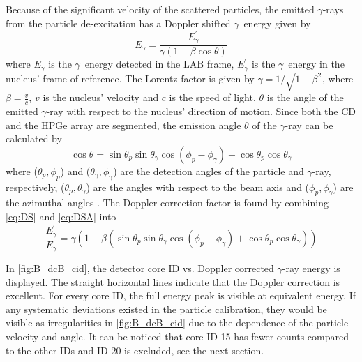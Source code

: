 \documentclass[twoside,english]{uiofysmaster/uiofysmaster}
\newcommand{\ga}{$\gamma$}
\let\orgautoref\autoref
\renewcommand{\autoref}
        {%
		 \def\sectionautorefname{Section}%
		 \def\subsectionautorefname{Section}%
		 \def\subsubsectionautorefname{Section}%
		 \def\chapterautorefname{Chapter}%
          \orgautoref}
\begin{document}
Because of the significant velocity of the scattered particles, the emitted \ga-rays from the particle de-excitation has a Doppler shifted \ga\ energy given by 
\begin{equation}\label{eq:DS}
	E_\gamma = \frac{E_\gamma^{'}}{\gamma (1 - \beta \cos \theta)}
\end{equation}
where $E_\gamma$ is the \ga\ energy detected in the LAB frame, $E_\gamma^{'}$ is the \ga\ energy in the nucleus' frame of reference.
The Lorentz factor is given by $\gamma = 1/\sqrt{1 - \beta^2}$, where $\beta = \frac{v}{c}$, $v$ is the nucleus' velocity and $c$ is the speed of light. 
$\theta$ is the angle of the emitted \ga-ray with respect to the nucleus' direction of motion. 
Since both the CD and the HPGe array are segmented, the emission angle $\theta$ of the \ga-ray can be calculated by 
\begin{equation}\label{eq:DSA}
	\cos \theta = \sin \theta_p \sin \theta_\gamma \cos (\phi_p - \phi_\gamma) + \cos \theta_p \cos \theta_\gamma
\end{equation}
where ($\theta_p, \phi_p$) and ($\theta_\gamma, \phi_\gamma$) are the detection angles of the particle and \ga-ray, respectively, ($\theta_p, \theta_\gamma$) are the angles with respect to the beam axis and ($\phi_p, \phi_\gamma$) are the azimuthal angles \cite{RIBF2012, MB-spect}. The Doppler correction factor is found by combining \autoref{eq:DS} and \autoref{eq:DSA} into
\begin{equation}
	\frac{E_\gamma^{'}}{E_\gamma} = \gamma (1 - \beta (\sin \theta_p \sin \theta_\gamma \cos (\phi_p - \phi_\gamma) + \cos \theta_p \cos \theta_\gamma))
\end{equation}

In \autoref{fig:B_dcB_cid}, the detector core ID vs. Doppler corrected \ga-ray energy is displayed.
The straight horizontal lines indicate that the Doppler correction is excellent. 
For every core ID, the full energy peak is visible at equivalent energy. 
If any systematic deviations existed in the particle calibration, they would be visible as irregularities in \autoref{fig:B_dcB_cid} due to the dependence of the particle velocity and angle. 
It can be noticed that core ID 15 has fewer counts compared to the other IDs and ID 20 is excluded, see the next section. 
\end{document}
